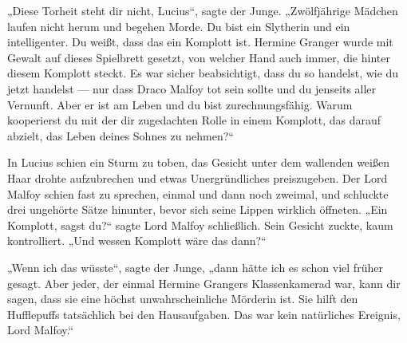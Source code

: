 „Diese Torheit steht dir nicht, Lucius“, sagte der Junge.
„Zwölfjährige Mädchen laufen nicht herum und begehen Morde. Du bist ein Slytherin und ein intelligenter. Du weißt, dass das ein Komplott ist. Hermine Granger wurde mit Gewalt auf dieses Spielbrett gesetzt, von welcher Hand auch immer, die hinter diesem Komplott steckt. Es war sicher beabsichtigt, dass du so handelst, wie du jetzt handelst — nur dass Draco Malfoy tot sein sollte und du jenseits aller Vernunft. Aber er ist am Leben und du bist zurechnungsfähig. Warum kooperierst du mit der dir zugedachten Rolle in einem Komplott, das darauf abzielt, das Leben deines Sohnes zu nehmen?“

In Lucius schien ein Sturm zu toben, das Gesicht unter dem wallenden weißen Haar drohte aufzubrechen und etwas Unergründliches preiszugeben. Der Lord Malfoy schien fast zu sprechen, einmal und dann noch zweimal, und schluckte drei ungehörte Sätze hinunter, bevor sich seine Lippen wirklich öffneten.
„Ein Komplott, sagst du?“ sagte Lord Malfoy schließlich. Sein Gesicht zuckte, kaum kontrolliert.
„Und wessen Komplott wäre das dann?“

„Wenn ich das wüsste“, sagte der Junge, „dann hätte ich es schon viel früher gesagt. Aber jeder, der einmal Hermine Grangers Klassenkamerad war, kann dir sagen, dass sie eine höchst unwahrscheinliche Mörderin ist. Sie hilft den Hufflepuffs tatsächlich bei den Hausaufgaben. Das war kein natürliches Ereignis, Lord Malfoy.“

